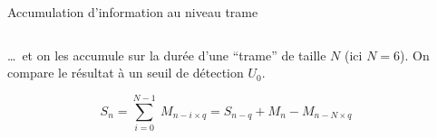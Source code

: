 \documentclass[../main.tex]{subfiles}
\begin{document}
\begin{frame}{Accumulation d'information au niveau trame}
  \begin{columns}
    \begin{column}{.5\linewidth}
      \begin{overlayarea}{\linewidth}{.875\textheight}
        \dots~et on les accumule sur la durée d'une ``trame'' de taille $N$ (ici $N = 6$). On compare le résultat à un seuil de détection $U_0$. \vspace{-1.75em}

        $$S_n = \sum_{i = 0}^{N - 1}\:M_{n - i \times q} = S_{n - q} + M_{n} - M_{n - N \times q}$$ \vspace{-2em}
        \begin{center}
          \resizebox{.6\linewidth}{!}{
            
          }
        \end{center}
      \end{overlayarea}
    \end{column}
    \begin{column}{.5\linewidth}
      \centering
      \resizebox{\linewidth}{!}{
        
      }
    \end{column}
  \end{columns}
\end{frame}
\end{document}
